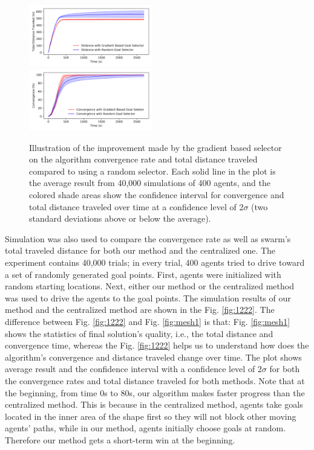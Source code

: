 \documentclass[journal]{IEEEtran}
\begin{document}
\begin{figure}[h!]
{\includegraphics[trim=10pt 10pt 10pt 5pt, clip,width=0.48\textwidth]{IEEEtran/comparison/random/comparison_random_tro_dis.png}
\\
\includegraphics[trim=10pt 10pt 10pt 5pt, clip, width=0.48\textwidth]{IEEEtran/comparison/random/comparison_random_tro.png}
}
 \caption{
 Illustration of the improvement made by the gradient based selector on the algorithm convergence rate and total distance traveled compared to using a random selector. Each solid line in the plot is the average result from 40,000 simulations of 400 agents, and the colored shade areas show the confidence interval for convergence and total distance traveled over time at a confidence level of 2$\sigma$ (two standard deviations above or below the average).}
 \label{fig:mesh2}
\end{figure}

Simulation was also used to compare the convergence rate as well as swarm's total traveled distance for both our method and the centralized one. The experiment contains 40,000 trials; in every trial, 400 agents tried to drive toward a set of randomly generated goal points. First, agents were initialized with random starting locations. Next, either our method or the centralized method was used to drive the agents to the goal points. The simulation results of our method and the centralized method are shown in the Fig. \ref{fig:1222}. The difference between Fig. \ref{fig:1222} and Fig. \ref{fig:mesh1} is that: Fig. \ref{fig:mesh1} shows the statistics of final solution's quality, i.e., the total distance and convergence time, whereas the Fig. \ref{fig:1222} helps us to understand how does the algorithm's convergence and distance traveled change over time. The plot shows average result and the confidence interval with a confidence level of $2\sigma$ for both the convergence rates and total distance traveled for both methods. Note that at the beginning, from time 0s to 80s, our algorithm makes faster progress than the centralized method.  This is because in the centralized method, agents take goals located in the inner area of the shape first so they will not block other moving agents' paths, while in our method, agents initially choose goals at random.  Therefore our method gets a short-term win at the beginning.
\end{document}
